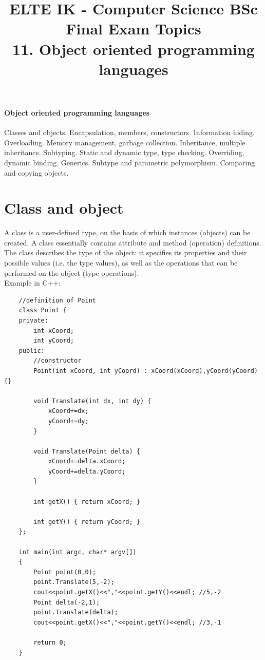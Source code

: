 \documentclass[margin=0px]{article}
\title{\textbf{{\Large ELTE IK - Computer Science BSc} \vspace{0.2cm} \\ {\huge Final Exam Topics}} \vspace{0.3cm} \\ 11. Object oriented programming languages}
\author{}
\date{}
\newenvironment{tetel}[1]{\paragraph{#1 \\}}{}
\begin{document}
\maketitle

\begin{center}
\end{center}

\begin{tetel}{Object oriented programming languages}
    Classes and objects. Encapsulation, members, constructors. Information hiding. Overloading. Memory management, garbage collection. Inheritance, multiple inheritance. Subtyping. Static and dynamic type, type checking. Overriding, dynamic binding. Generics. Subtype and parametric polymorphism. Comparing and copying objects.
\end{tetel}

\section{Class and object}

A class is a user-defined type, on the basis of which instances (objects)
can be created. A class essentially contains attribute and method (operation)
definitions. The class describes the type of the object: it specifies its properties and their
possible values (i.e. the type values), as well as the operations that can be performed on the object (type operations).\\

\noindent Example in C++:
\begin{verbatim}
    //definition of Point
    class Point {
    private:
        int xCoord;
        int yCoord;
    public:
        //constructor
        Point(int xCoord, int yCoord) : xCoord(xCoord),yCoord(yCoord) {}

        void Translate(int dx, int dy) {
            xCoord+=dx;
            yCoord+=dy;
        }

        void Translate(Point delta) {
            xCoord+=delta.xCoord;
            yCoord+=delta.yCoord;
        }

        int getX() { return xCoord; }

        int getY() { return yCoord; }
    };

    int main(int argc, char* argv[])
    {
        Point point(0,0);
        point.Translate(5,-2);
        cout<<point.getX()<<","<<point.getY()<<endl; //5,-2
        Point delta(-2,1);
        point.Translate(delta);
        cout<<point.getX()<<","<<point.getY()<<endl; //3,-1

        return 0;
    }
    \end{verbatim}
\end{document}

